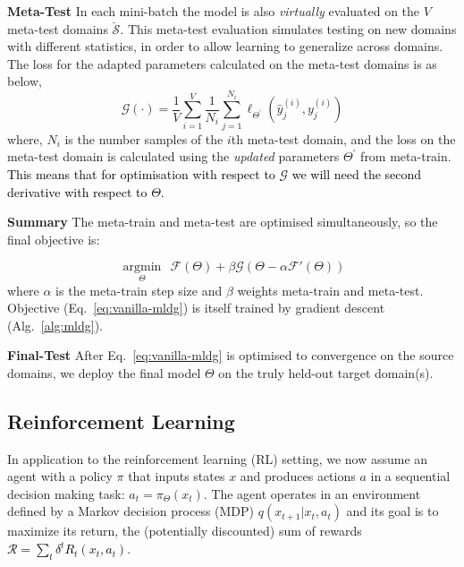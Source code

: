 \documentclass[letterpaper]{article} \usepackage{aaai18}  \usepackage{times}  \usepackage{helvet}  \usepackage{courier}  \usepackage{url}  \usepackage{graphicx}  \usepackage{amsmath}
\newcommand{\keypoint}[1]{\vspace{0.1cm}\noindent\textbf{#1}\quad}
\begin{document}
\keypoint{Meta-Test} In each mini-batch 
the model is also \textit{virtually} evaluated on the $V$ meta-test domains $\breve{\mathcal{S}}$. This meta-test evaluation simulates testing on new domains with different statistics, in order to allow {learning} to generalize across domains. The loss for the adapted parameters calculated on the meta-test domains is as below,
\begin{equation}
\label{meta-test}
\mathcal{G}(\cdot) = \frac{1}{V} \sum^{V}_{i=1} \frac{1}{{N}_{i}}\sum^{{N}_{i}}_{j=1} \ell_{\Theta^{'}}(\hat{{y}}_j^{(i)},{{y}}_j^{(i)})
\end{equation}
where, ${N}_{i}$ is the number samples of the $i$th meta-test domain, and the loss on the meta-test domain is calculated using the \emph{updated} parameters $\Theta^{'}$ from meta-train. \textcolor{black}{This means that for optimisation with respect to $\mathcal{G}$ we will need the second derivative with respect to $\Theta$.}



\keypoint{Summary} The meta-train and meta-test are optimised simultaneously, so the final objective is:

\begin{equation}
\underset{\Theta}{\operatorname{argmin}}~~ \mathcal{F}(\Theta) + \beta \mathcal{G}(\Theta - \alpha \mathcal{F}'(\Theta))
\label{eq:vanilla-mldg}
\end{equation}
\noindent where $\alpha$ is the meta-train step size and $\beta$ weights meta-train and meta-test. Objective (Eq.~\ref{eq:vanilla-mldg}) is itself trained by gradient descent (Alg.~\ref{alg:mldg}).

\keypoint{Final-Test} After Eq.~\ref{eq:vanilla-mldg} is optimised to convergence on the source domains, we deploy the final model $\Theta$ on the truly held-out target domain(s).





\subsection{Reinforcement Learning}
In application to the reinforcement learning (RL) setting, we now assume an agent with a policy $\pi$ that inputs states $x$ and produces actions $a$ in a sequential decision making task: $a_t=\pi_\Theta(x_t)$. The agent operates in an environment defined by a Markov decision process (MDP) $q(x_{t+1}|x_t,a_t)$ and its goal is to maximize its return, the (potentially discounted) sum of rewards \textcolor{black}{$\mathcal{R}=\sum_t \delta^t R_t(x_t,a_t)$}. 
\end{document}
